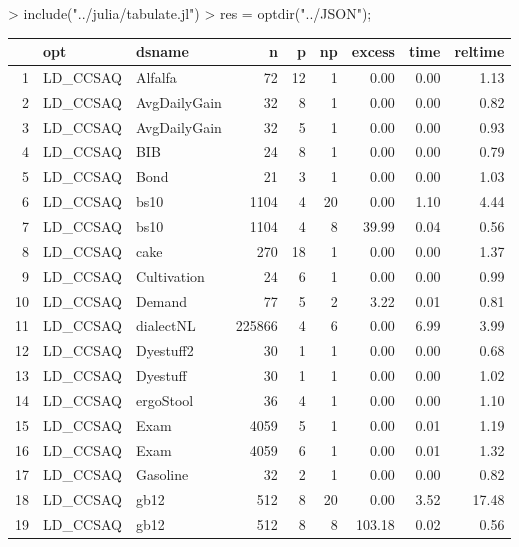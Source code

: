 \documentclass[article]{jss}
\begin{document}
\begin{Schunk}
\begin{Sinput}
> include("../julia/tabulate.jl")
> res = optdir("../JSON");
\end{Sinput}
\end{Schunk}

\begin{table}[htbp]
\centering
\begin{tabular}{rllrrrrrr}
  \hline
 & opt & dsname & n & p & np & excess & time & reltime \\ 
  \hline
1 & LD\_CCSAQ & Alfalfa &  72 &  12 &   1 & 0.00 & 0.00 & 1.13 \\ 
  2 & LD\_CCSAQ & AvgDailyGain &  32 &   8 &   1 & 0.00 & 0.00 & 0.82 \\ 
  3 & LD\_CCSAQ & AvgDailyGain &  32 &   5 &   1 & 0.00 & 0.00 & 0.93 \\ 
  4 & LD\_CCSAQ & BIB &  24 &   8 &   1 & 0.00 & 0.00 & 0.79 \\ 
  5 & LD\_CCSAQ & Bond &  21 &   3 &   1 & 0.00 & 0.00 & 1.03 \\ 
  6 & LD\_CCSAQ & bs10 & 1104 &   4 &  20 & 0.00 & 1.10 & 4.44 \\ 
  7 & LD\_CCSAQ & bs10 & 1104 &   4 &   8 & 39.99 & 0.04 & 0.56 \\ 
  8 & LD\_CCSAQ & cake & 270 &  18 &   1 & 0.00 & 0.00 & 1.37 \\ 
  9 & LD\_CCSAQ & Cultivation &  24 &   6 &   1 & 0.00 & 0.00 & 0.99 \\ 
  10 & LD\_CCSAQ & Demand &  77 &   5 &   2 & 3.22 & 0.01 & 0.81 \\ 
  11 & LD\_CCSAQ & dialectNL & 225866 &   4 &   6 & 0.00 & 6.99 & 3.99 \\ 
  12 & LD\_CCSAQ & Dyestuff2 &  30 &   1 &   1 & 0.00 & 0.00 & 0.68 \\ 
  13 & LD\_CCSAQ & Dyestuff &  30 &   1 &   1 & 0.00 & 0.00 & 1.02 \\ 
  14 & LD\_CCSAQ & ergoStool &  36 &   4 &   1 & 0.00 & 0.00 & 1.10 \\ 
  15 & LD\_CCSAQ & Exam & 4059 &   5 &   1 & 0.00 & 0.01 & 1.19 \\ 
  16 & LD\_CCSAQ & Exam & 4059 &   6 &   1 & 0.00 & 0.01 & 1.32 \\ 
  17 & LD\_CCSAQ & Gasoline &  32 &   2 &   1 & 0.00 & 0.00 & 0.82 \\ 
  18 & LD\_CCSAQ & gb12 & 512 &   8 &  20 & 0.00 & 3.52 & 17.48 \\ 
  19 & LD\_CCSAQ & gb12 & 512 &   8 &   8 & 103.18 & 0.02 & 0.56 \\ 

\end{tabular}
\end{table}
\end{document}
